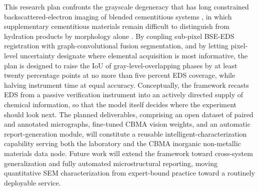 \documentclass[11pt,a4paper]{article}
\begin{document}
This research plan confronts the grayscale degeneracy that has long constrained backscattered-electron imaging of blended cementitious systems \citep{scrivener2004}, in which supplementary cementitious materials remain difficult to distinguish from hydration products by morphology alone \citep{lothenbach2011}. By coupling sub-pixel BSE-EDS registration with graph-convolutional fusion segmentation, and by letting pixel-level uncertainty designate where elemental acquisition is most informative, the plan is designed to raise the IoU of gray-level-overlapping phases by at least twenty percentage points at no more than five percent EDS coverage, while halving instrument time at equal accuracy. Conceptually, the framework recasts EDS from a passive verification instrument into an actively directed supply of chemical information, so that the model itself decides where the experiment should look next. The planned deliverables, comprising an open dataset of paired and annotated micrographs, fine-tuned CBMA vision weights, and an automatic report-generation module, will constitute a reusable intelligent-characterization capability serving both the laboratory and the CBMA inorganic non-metallic materials data node. Future work will extend the framework toward cross-system generalization and fully automated microstructural reporting, moving quantitative SEM characterization from expert-bound practice toward a routinely deployable service.




\end{document}
